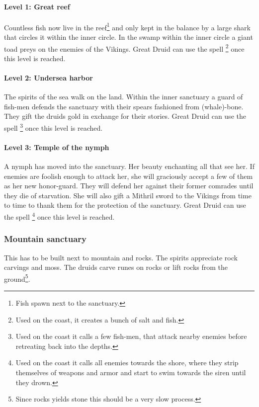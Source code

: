 \documentclass[a4paper]{book}
\begin{document}
\paragraph{Level 1: Great reef}
Countless fish now live in the reef\footnote{ Fish spawn next to the sanctuary.
} and only kept in the balance by a large shark that circles it within the
inner circle. In the swamp within the inner circle a giant toad preys on the
enemies of the \gls{Vikings}. Great Druid can use the spell \footnote{ Used on the coast, it creates a bunch of salt and fish. } once
this level is reached.

\paragraph{Level 2: Undersea harbor}
The spirits of the sea walk on the land. Within the inner sanctuary a guard of
fish-men defends the sanctuary with their spears fashioned from (whale)-bone.
They gift the druids gold in exchange for their stories. Great Druid can use
the spell \footnote{ Used on the coast it calls a few
	fish-men, that attack nearby enemies before retreating back into the depths. }
once this level is reached.

\paragraph{Level 3: Temple of the nymph}
A nymph has moved into the sanctuary. Her beauty enchanting all that see her.
If enemies are foolish enough to attack her, she will graciously accept a few
of them as her new honor-guard. They will defend her against their former
comrades until they die of starvation. She will also gift a Mithril sword to
the \gls{Vikings} from time to time to thank them for the protection of the
sanctuary. Great Druid can use the spell \footnote{ Used
	on the coast it calls all enemies towards the shore, where they strip
	themselves of weapons and armor and start to swim towards the siren until they
	drown. } once this level is reached.

\subsubsection{Mountain sanctuary}
This has to be built next to mountain and rocks. The spirits appreciate rock
carvings and moss. The druids carve runes on rocks or lift rocks from the
ground\footnote{ Since rocks yields stone this should be a very slow process.
}.
\end{document}
